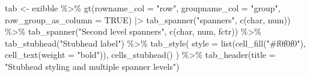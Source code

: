 \documentclass[
  letterpaper,
  DIV=11,
  numbers=noendperiod]{scrartcl}
\newenvironment{Shaded}{\begin{snugshade}}{\end{snugshade}}
\newcommand{\AttributeTok}[1]{\textcolor[rgb]{0.40,0.45,0.13}{#1}}
\newcommand{\ConstantTok}[1]{\textcolor[rgb]{0.56,0.35,0.01}{#1}}
\newcommand{\FunctionTok}[1]{\textcolor[rgb]{0.28,0.35,0.67}{#1}}
\newcommand{\NormalTok}[1]{\textcolor[rgb]{0.00,0.23,0.31}{#1}}
\newcommand{\OtherTok}[1]{\textcolor[rgb]{0.00,0.23,0.31}{#1}}
\newcommand{\SpecialCharTok}[1]{\textcolor[rgb]{0.37,0.37,0.37}{#1}}
\newcommand{\StringTok}[1]{\textcolor[rgb]{0.13,0.47,0.30}{#1}}
\begin{document}
\begin{Shaded}
\begin{Highlighting}[]
\NormalTok{tab }\OtherTok{\textless{}{-}}\NormalTok{ exibble }\SpecialCharTok{\%\textgreater{}\%}
  \FunctionTok{gt}\NormalTok{(}\AttributeTok{rowname\_col =} \StringTok{"row"}\NormalTok{, }\AttributeTok{groupname\_col =} \StringTok{"group"}\NormalTok{, }\AttributeTok{row\_group\_as\_column =} \ConstantTok{TRUE}\NormalTok{) }\SpecialCharTok{|\textgreater{}}
  \FunctionTok{tab\_spanner}\NormalTok{(}\StringTok{"spanners"}\NormalTok{, }\FunctionTok{c}\NormalTok{(char, num)) }\SpecialCharTok{\%\textgreater{}\%}
  \FunctionTok{tab\_spanner}\NormalTok{(}\StringTok{"Second level spanners"}\NormalTok{, }\FunctionTok{c}\NormalTok{(char, num, fctr)) }\SpecialCharTok{\%\textgreater{}\%}
  \FunctionTok{tab\_stubhead}\NormalTok{(}\StringTok{"Stubhead label"}\NormalTok{) }\SpecialCharTok{\%\textgreater{}\%}
  \FunctionTok{tab\_style}\NormalTok{(}
    \AttributeTok{style =} \FunctionTok{list}\NormalTok{(}\FunctionTok{cell\_fill}\NormalTok{(}\StringTok{"\#f0f0f0"}\NormalTok{), }\FunctionTok{cell\_text}\NormalTok{(}\AttributeTok{weight =} \StringTok{"bold"}\NormalTok{)),}
    \FunctionTok{cells\_stubhead}\NormalTok{()}
\NormalTok{  ) }\SpecialCharTok{\%\textgreater{}\%} 
  \FunctionTok{tab\_header}\NormalTok{(}\AttributeTok{title =} \StringTok{"Stubhead styling and multiple spanner levels"}\NormalTok{)}
\end{Highlighting}
\end{Shaded}
\end{document}
